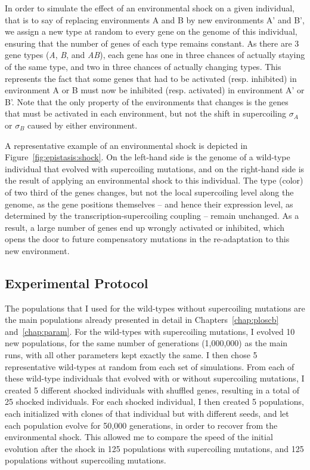 In order to simulate the effect of an environmental shock on a given individual, that is to say of replacing environments A and B by new environments A' and B', we assign a new type at random to every gene on the genome of this individual, ensuring that the number of genes of each type remains constant.
As there are 3 gene types (\emph{A}, \emph{B}, and \emph{AB}), each gene has one in three chances of actually staying of the same type, and two in three chances of actually changing types.
This represents the fact that some genes that had to be activated (resp. inhibited) in environment A or B must now be inhibited (resp. activated) in environment A' or B'.
Note that the only property of the environments that changes is the genes that must be activated in each environment, but not the shift in supercoiling $\sigma_A$ or $\sigma_B$ caused by either environment.

A representative example of an environmental shock is depicted in Figure~\ref{fig:epistasis:shock}.
On the left-hand side is the genome of a wild-type individual that evolved with supercoiling mutations, and on the right-hand side is the result of applying an environmental shock to this individual.
The type (color) of two third of the genes changes, but not the local supercoiling level along the genome, as the gene positions themselves -- and hence their expression level, as determined by the transcription-supercoiling coupling -- remain unchanged.
As a result, a large number of genes end up wrongly activated or inhibited, which opens the door to future compensatory mutations in the re-adaptation to this new environment.

\subsection{Experimental Protocol}

The populations that I used for the wild-types without supercoiling mutations are the main populations already presented in detail in Chapters~\ref{chap:ploscb} and~\ref{chap:param}.
For the wild-types with supercoiling mutations, I evolved 10 new populations, for the same number of generations (1,000,000) as the main runs, with all other parameters kept exactly the same.
I then chose 5 representative wild-types at random from each set of simulations.
From each of these wild-type individuals that evolved with or without supercoiling mutations, I created 5 different shocked individuals with shuffled genes, resulting in a total of 25 shocked individuals.
For each shocked individual, I then created 5 populations, each initialized with clones of that individual but with different seeds, and let each population evolve for 50,000 generations, in order to recover from the environmental shock.
This allowed me to compare the speed of the initial evolution after the shock in 125 populations with supercoiling mutations, and 125 populations without supercoiling mutations.


